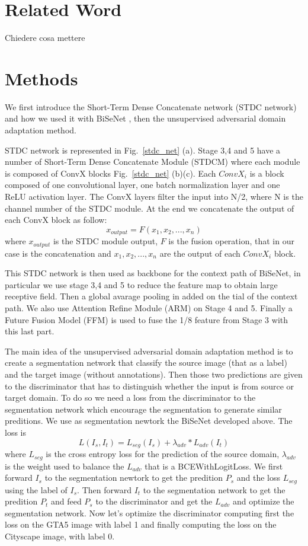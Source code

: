 \documentclass[conference]{IEEEtran}
\begin{document}
\section{Related Word}

Chiedere cosa mettere
\section{Methods}

We first introduce the Short-Term Dense Concatenate network (STDC network) and how we used it with BiSeNet \cite{b2},
then the unsupervised adversarial domain adaptation method.

STDC network \cite{b1} is represented in Fig.~\ref{stdc_net} (a). Stage 3,4 and 5 have a number of Short-Term Dense Concatenate Module (STDCM)
where each module is composed of ConvX blocks Fig.~\ref{stdc_net} (b)(c). Each \(ConvX_i\) is a block composed of one convolutional layer,
one batch normalization layer and one ReLU activation layer. The ConvX layers filter the input into N/2, where N is the channel number
of the STDC module. At the end we concatenate the output of each ConvX block as follow: 
\[x_{output} = F(x_1,x_2,...,x_n)\]
where \(x_{output}\) is the STDC module output, \(F\) is the fusion operation, that in our case is the concatenation and \(x_1,x_2,
...,x_n\) are the output of each \(ConvX_i\) block.

This STDC network is then used as backbone for the context path of BiSeNet, in particular we use stage 3,4 and 5 to reduce the 
feature map to obtain large receptive field. Then a global avarage pooling in added on the tial of the context path. We also use
Attention Refine Module (ARM) on Stage 4 and 5. Finally a Future Fusion Model (FFM) is used to fuse the 1/8
feature from Stage 3 with this last part.

The main idea of the unsupervised adversarial domain adaptation method \cite{b3} is to create a segmentation network that classify the source
image (that as a label) and the target image (without annotations). Then those two predictions are given to the discriminator that
has to distinguish whether the input is from source or target domain. To do so we need a loss from the discriminator to the 
segmentation network which encourage the segmentation to generate similar preditions. We use as segmentation newtork the BiSeNet 
developed above. The loss is 
\[L(I_s,I_t) = L_{seg}(I_s) + \lambda_{adv}*L_{adv}(I_t)\]
where \(L_{seg}\) is the cross entropy loss for the prediction of the source domain, \(\lambda_{adv}\) is the weight used to 
balance the \(L_{adv}\) that is a BCEWithLogitLoss.
We first forward \(I_s\) to the segmentation newtork to get the predition \(P_s\) and the loss \(L_{seg}\) using the label of \(I_s\).
Then forward \(I_t\) to the segmentation network to get the predition \(P_t\) and feed \(P_s\) to the discriminator and get the 
\(L_{adv}\) and optimize the segmentation network. Now let's optimize the discriminator computing first the loss on the GTA5 image
with label 1 and finally computing the loss on the Cityscape image, with label 0. 
\end{document}
